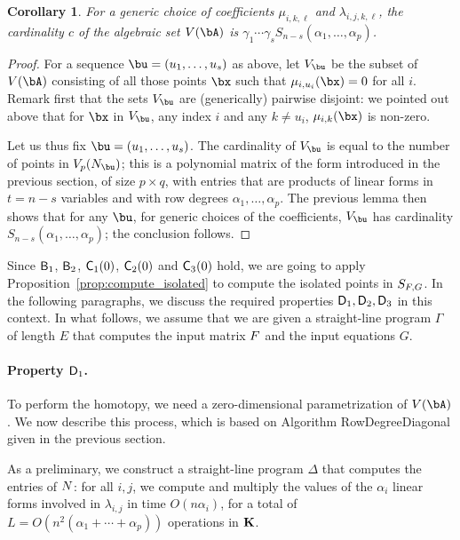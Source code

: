 \documentclass[12pt]{article}
\newtheorem{corollary}[definition]{Corollary}
\begin{document}
\begin{corollary}\label{coro:complete}
  For a generic choice of coefficients $\mu_{i,k,\ell}$ and
  $\lambda_{i,j,k,\ell}$, the cardinality $c$ of the algebraic set
  $V(\bA)$ is $\gamma_1 \cdots \gamma_s S_{n-s}(\alpha_1,\dots,\alpha_p)$.
\end{corollary}
\begin{proof}
  For a sequence $\bu=(u_1,\dots,u_s)$ as above, let $V_\bu$ be the
  subset of $V(\bA)$ consisting of all those points $\bx$ such that
  $\mu_{i,u_i}(\bx)=0$ for all $i$. Remark first that the sets $V_\bu$
  are (generically) pairwise disjoint: we pointed out above that for
  $\bx$ in $V_\bu$, any index $i$ and any $k \ne u_i$,
  $\mu_{i,k}(\bx)$ is non-zero.
  
  Let us thus fix $\bu=(u_1,\dots,u_s)$. The cardinality of $V_\bu$ is
  equal to the number of points in $V_p(\mN_\bu)$; this is a
  polynomial matrix of the form introduced in the previous section, of
  size $p \times q$, with entries that are products of linear forms in
  $t=n-s$ variables and with row degrees
  $\alpha_1,\dots,\alpha_p$. The previous lemma then shows that for
  any $\bu$, for generic choices of the coefficients, $V_\bu$ has
  cardinality $S_{n-s}(\alpha_1,\dots,\alpha_p)$; the conclusion
  follows.
\end{proof}



Since $\mathsf{B}_1$, $\mathsf{B}_2$, $\mathsf{C}_1(0)$, $\mathsf{C}_2(0)$ and
$\mathsf{C}_3(0)$ hold, we are going to apply
Proposition~\ref{prop:compute_isolated} to compute the isolated points
in $S_{{F},G}$. In the following paragraphs, we discuss the required
properties $\mathsf{D}_1,\mathsf{D}_2,\mathsf{D}_3$ in this context. In what follows,
we assume that we are given a straight-line program $\Gamma$ of length
$E$ that computes the input matrix ${F}$ and the input equations $G$.

\paragraph{Property $\mathsf{D}_1$.} To perform the homotopy, we need a zero-dimensional parametrization of
$V(\bA)$. We now describe this process, which is based on Algorithm
          {\sf RowDegreeDiagonal} given in the previous section.

As a preliminary, we construct a straight-line program $\Delta$ that
computes the entries of ${N}$: for all $i,j$, we compute and multiply
the values of the $\alpha_i$ linear forms involved in $\lambda_{i,j}$
in time $O(n \alpha_i)$, for a total of $L=O(n^2 (\alpha_1+\cdots+\alpha_p))$
operations in $\mathbf{K}$.
\end{document}
